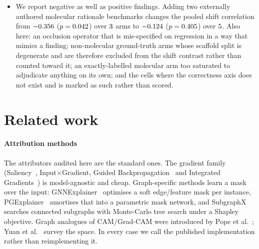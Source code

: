 \begin{itemize}
{  $\pooledCalibRho{}$} when cells are pooled, a Simpson's-paradox trap for
  anyone reporting a single aggregate number.
\item We report negative as well as positive findings. Adding two externally
  authored molecular rationale benchmarks changes the pooled shift correlation
  from $-0.356{}$ ($p=0.042{}$) over
  $3{}$ arms to $-0.124{}$
  ($p=0.405{}$) over $5{}$. Also here: an occlusion
  operator that is mis-specified on regression in a way that mimics a finding;
  non-molecular ground-truth arms whose scaffold split is degenerate and are
  therefore excluded from the shift contrast rather than counted toward it; an
  exactly-labelled molecular arm too saturated to adjudicate anything on its
  own; and the \nNoGtCells{} cells where the correctness axis does not exist
  and is marked as such rather than scored.
\end{itemize}

\section{Related work}

\paragraph{Attribution methods} The attributors audited here are the standard
ones. The gradient family (Saliency~\cite{saliency}, Input×Gradient, Guided
Backpropagation~\cite{guidedbp} and Integrated Gradients~\cite{ig}) is
model-agnostic and cheap. Graph-specific methods learn a mask over the
input: GNNExplainer~\cite{gnnexplainer} optimises a soft edge/feature mask per
instance, PGExplainer~\cite{pgexplainer} amortises that into a parametric mask
network, and SubgraphX~\cite{subgraphx} searches connected subgraphs with
Monte-Carlo tree search under a Shapley objective. Graph analogues of
CAM/Grad-CAM were introduced by Pope et al.~\cite{gradcamgraph}; Yuan et
al.~\cite{gnnsurvey} survey the space. In every case we call the published
implementation rather than reimplementing it.

